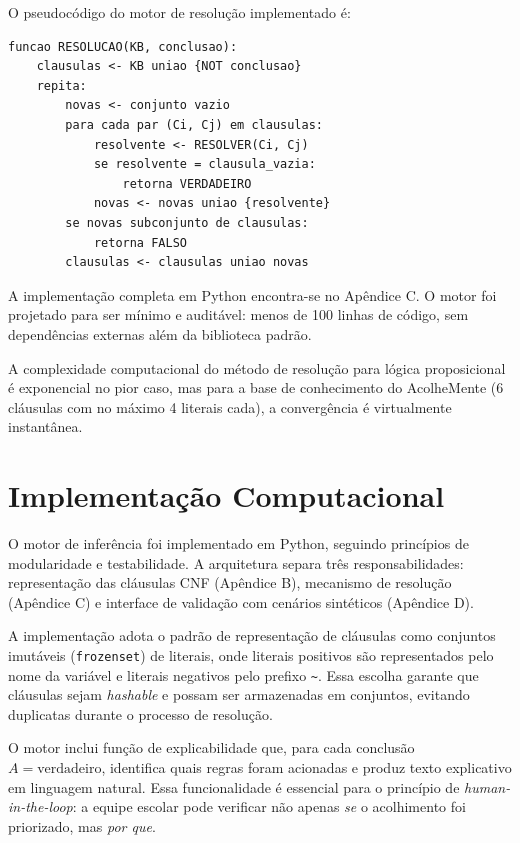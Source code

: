 \documentclass[
    12pt,
    openright,
    oneside,
    a4paper,
    english,
    brazil
]{abntex2}
\begin{document}
O pseudocódigo do motor de resolução implementado é:

\begin{lstlisting}[caption={Pseudocódigo do motor de resolução.},label={lst:pseudocodigo}]
funcao RESOLUCAO(KB, conclusao):
    clausulas <- KB uniao {NOT conclusao}
    repita:
        novas <- conjunto vazio
        para cada par (Ci, Cj) em clausulas:
            resolvente <- RESOLVER(Ci, Cj)
            se resolvente = clausula_vazia:
                retorna VERDADEIRO
            novas <- novas uniao {resolvente}
        se novas subconjunto de clausulas:
            retorna FALSO
        clausulas <- clausulas uniao novas
\end{lstlisting}

A implementação completa em Python encontra-se no Apêndice C. O motor foi projetado para ser mínimo e auditável: menos de 100 linhas de código, sem dependências externas além da biblioteca padrão.

A complexidade computacional do método de resolução para lógica proposicional é exponencial no pior caso, mas para a base de conhecimento do AcolheMente (6 cláusulas com no máximo 4 literais cada), a convergência é virtualmente instantânea.

\chapter{Implementação Computacional}

O motor de inferência foi implementado em Python, seguindo princípios de modularidade e testabilidade. A arquitetura separa três responsabilidades: representação das cláusulas CNF (Apêndice B), mecanismo de resolução (Apêndice C) e interface de validação com cenários sintéticos (Apêndice D).

A implementação adota o padrão de representação de cláusulas como conjuntos imutáveis (\texttt{frozenset}) de literais, onde literais positivos são representados pelo nome da variável e literais negativos pelo prefixo \texttt{\textasciitilde}. Essa escolha garante que cláusulas sejam \textit{hashable} e possam ser armazenadas em conjuntos, evitando duplicatas durante o processo de resolução.

O motor inclui função de explicabilidade que, para cada conclusão $A = \text{verdadeiro}$, identifica quais regras foram acionadas e produz texto explicativo em linguagem natural. Essa funcionalidade é essencial para o princípio de \textit{human-in-the-loop}: a equipe escolar pode verificar não apenas \textit{se} o acolhimento foi priorizado, mas \textit{por que}.
\end{document}
